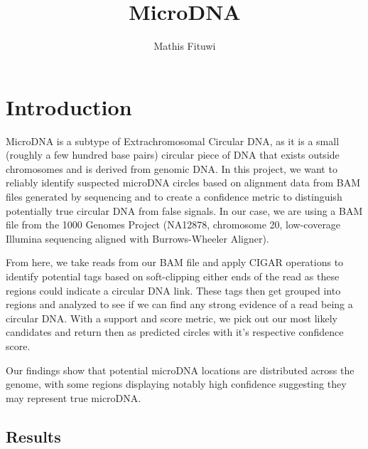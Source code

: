 \documentclass[11pt, letterpaper]{article}
\begin{document}
\title{MicroDNA}
\author{Mathis Fituwi}
\maketitle

\section{Introduction}

MicroDNA is a subtype of Extrachromosomal Circular DNA, as it is a small (roughly a few hundred base pairs) circular piece of DNA that exists outside chromosomes and is derived from genomic DNA. In this project, we want to reliably identify suspected microDNA circles based on alignment data from BAM files generated by sequencing and to create a confidence metric to distinguish potentially true circular DNA from false signals. In our case, we are using a BAM file from the 1000 Genomes Project (NA12878, chromosome 20, low-coverage Illumina sequencing aligned with Burrows-Wheeler Aligner).
\vspace{\baselineskip}

From here, we take reads from our BAM file and apply CIGAR operations to identify potential tags based on soft-clipping either ends of the read as these regions could indicate a circular DNA link. These tags then get grouped into regions and analyzed to see if we can find any strong evidence of a read being a circular DNA. With a support and score metric, we pick out our most likely candidates and return then as predicted circles with it's respective confidence score.

\vspace{\baselineskip}

Our findings show that potential microDNA locations are distributed across the genome, with some regions displaying notably high confidence suggesting they may represent true microDNA.









    
    

\subsection{Results}
\end{document}
